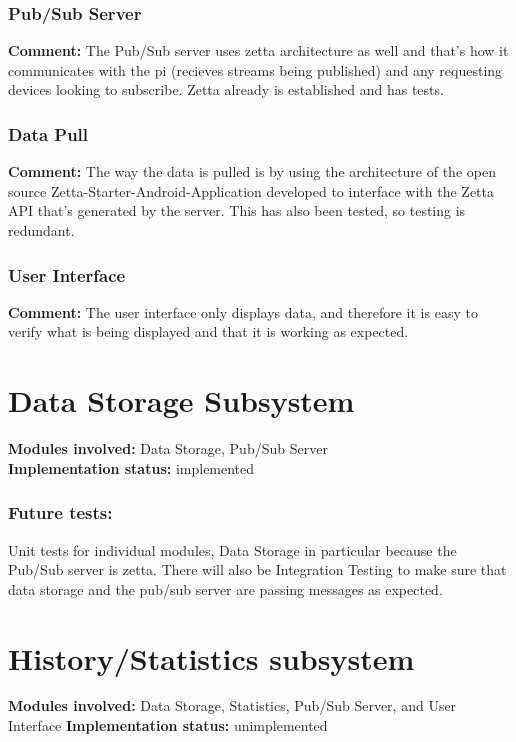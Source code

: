 \documentclass[12pt]{article}
\begin{document}
{	\subsubsection{Pub/Sub Server}
	\textbf{Comment:} The Pub/Sub server uses zetta architecture as well and that's how it communicates with the pi (recieves streams being published) and any requesting devices looking to subscribe. Zetta already is established and has tests.

	\subsubsection{Data Pull}
	\textbf{Comment:} The way the data is pulled is by using the architecture of the open source Zetta-Starter-Android-Application developed to interface with the Zetta API that's generated by the server. This has also been tested, so testing is redundant.
	\subsubsection{User Interface}
	\textbf{Comment:} The user interface only displays data, and therefore it is easy to verify what is being displayed and that it is working as expected.
	
	
	
	
	
	\pagebreak

	\section{Data Storage Subsystem}
	\textbf{Modules involved: } Data Storage, Pub/Sub Server \\
	\textbf{Implementation status:} implemented \\
	\subsubsection{Future tests:} Unit tests for individual modules, Data Storage in particular because the Pub/Sub server is zetta. There will also be Integration Testing to make sure that data storage and the pub/sub server are passing messages as expected. 

	\section{History/Statistics subsystem}
	\textbf{Modules involved:} Data Storage, Statistics, Pub/Sub Server, and User Interface
	\textbf{Implementation status:} unimplemented
}
\end{document}
